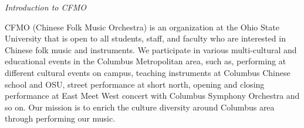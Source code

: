 \documentclass[letter,6pt,poets]{ConcProg}
\begin{document}
\begin{spacing}{1.0}
\begin{multicols}{2}
\end{multicols}
\begin{center}
\Large\textsl{ Introduction to CFMO}
\end{center}

CFMO (Chinese Folk Music Orchestra) is an organization at the Ohio State University that is open to all students, staff, and faculty who are interested in Chinese folk music and instruments. We participate in various multi-cultural and educational events in the Columbus Metropolitan area, such as, performing at different cultural events on campus, teaching instruments at Columbus Chinese school and OSU, street performance at short north, opening and closing performance at East Meet West concert with Columbus Symphony Orchestra and so on. Our mission is to enrich the culture diversity around Columbus area through performing our music.
\end{spacing}
\end{document}
